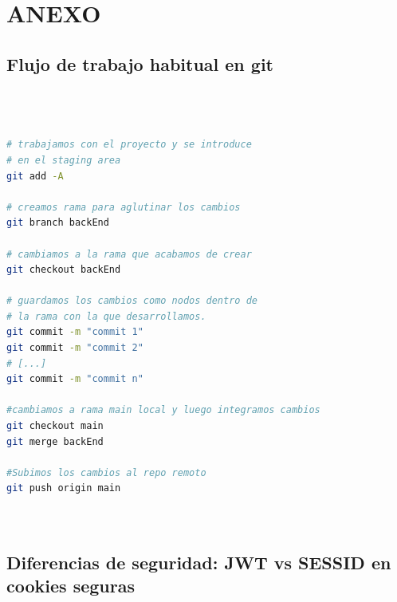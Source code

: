 \documentclass[a4paper,12pt]{report}
\begin{document}
	
	
	
	
	
	
	
	
	
	
	
	
	
	
	\chapter{ANEXO}
	\label{chap:anexo} %
		
			
		\section{Flujo de trabajo habitual en git}
		\label{sec:anexoFlujoGit}
		
\begin{lstlisting}[language=bash, basicstyle=\ttfamily\small]
	


# trabajamos con el proyecto y se introduce
# en el staging area
git add -A 

# creamos rama para aglutinar los cambios
git branch backEnd

# cambiamos a la rama que acabamos de crear
git checkout backEnd

# guardamos los cambios como nodos dentro de
# la rama con la que desarrollamos.	
git commit -m "commit 1"  	
git commit -m "commit 2"
# [...]
git commit -m "commit n"

#cambiamos a rama main local y luego integramos cambios
git checkout main
git merge backEnd

#Subimos los cambios al repo remoto
git push origin main 

	
\end{lstlisting}
		
	
\pagebreak

		
		
		\section{Diferencias de seguridad: JWT vs SESSID en cookies seguras}
		\label{sec:anexo_JWTvsSESSIONS}
						
\end{document}
